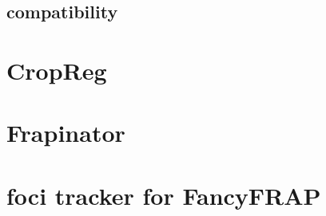 
  \subsection{compatibility}

\section{CropReg}
\label{sec:cropreg}
\section{Frapinator}
\label{sec:frapinator}
\section{foci tracker for FancyFRAP}


